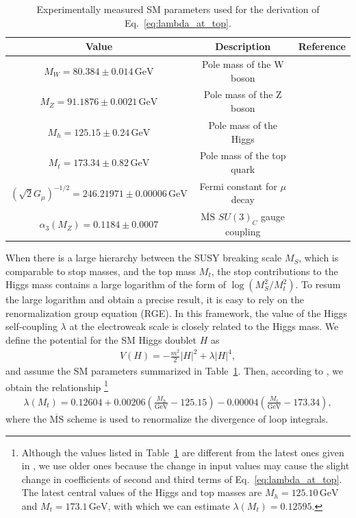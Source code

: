 \documentclass[12pt,twoside,book]{article}
\begin{document}
\begin{table}[t]
  \centering
  \begin{tabular}{ccc}
    Value & Description & Reference\\ \hline
    $M_W = 80.384 \pm 0.014\, \mathrm{GeV}$ & Pole mass of the W boson
      & \cite{Group:2012gb,Alcaraz:1016509} \\
    $M_Z = 91.1876 \pm 0.0021\, \mathrm{GeV}$ & Pole mass of the Z boson
      & \cite{Beringer:1900zz} \\
    $M_h = 125.15 \pm 0.24\, \mathrm{GeV}$ & Pole mass of the Higgs
      & \cite{Aad:2013wqa,Chatrchyan:2013mxa} \\
    $M_t = 173.34 \pm 0.82\, \mathrm{GeV}$ & Pole mass of the top quark
      & \cite{ATLAS:2014wva} \\
    $\left( \sqrt{2} G_\mu \right)^{-1/2} = 246.21971 \pm 0.00006\, \mathrm{GeV}$
      & Fermi constant for $\mu$ decay & \cite{Tishchenko:2012ie} \\
    $\alpha_3 (M_Z) = 0.1184 \pm 0.0007$
      & $\overline{\mathrm{MS}}$ $SU(3)_C$ gauge coupling & \cite{Bethke:2012jm}
  \end{tabular}
  \caption{Experimentally measured SM parameters used for the derivation of Eq.~\eqref{eq:lambda_at_top}.}
  \label{tab:SM_param}
\end{table}

When there is a large hierarchy between the SUSY breaking scale $M_S$, which is comparable to stop masses, and the top mass $M_t$, the stop contributions to the Higgs mass contains a large logarithm of the form of $\log \left( M_S^2 / M_t^2 \right)$.
To resum the large logarithm and obtain a precise result, it is easy to rely on the renormalization group equation (RGE).
In this framework, the value of the Higgs self-coupling $\lambda$ at the electroweak scale is closely related to the Higgs mass.
We define the potential for the SM Higgs doublet $H$ as
\begin{align}
  V(H) = -\frac{m^2}{2} |H|^2 + \lambda |H|^4,
\end{align}
and assume the SM parameters summarized in Table~\ref{tab:SM_param}.
Then, according to \cite{Buttazzo:2013uya}, we obtain the relationship
\footnote{
  Although the values listed in Table~\ref{tab:SM_param} are different from the latest ones given in \cite{Tanabashi:2018oca}, we use older ones because the change in input values may cause the slight change in coefficients of second and third terms of Eq.~\eqref{eq:lambda_at_top}.
  The latest central values of the Higgs and top masses are $M_h = 125.10\,\mathrm{GeV}$ and $M_t = 173.1\,\mathrm{GeV}$, with which we can estimate $\lambda (M_t) = 0.12595$.
}
\begin{align}
  \lambda (M_t) = 0.12604
  + 0.00206 \left( \frac{M_h}{\mathrm{GeV}} - 125.15 \right)
  - 0.00004 \left( \frac{M_t}{\mathrm{GeV}} - 173.34 \right),
  \label{eq:lambda_at_top}
\end{align}
where the $\overline{\mathrm{MS}}$ scheme is used to renormalize the divergence of loop integrals.
\end{document}
